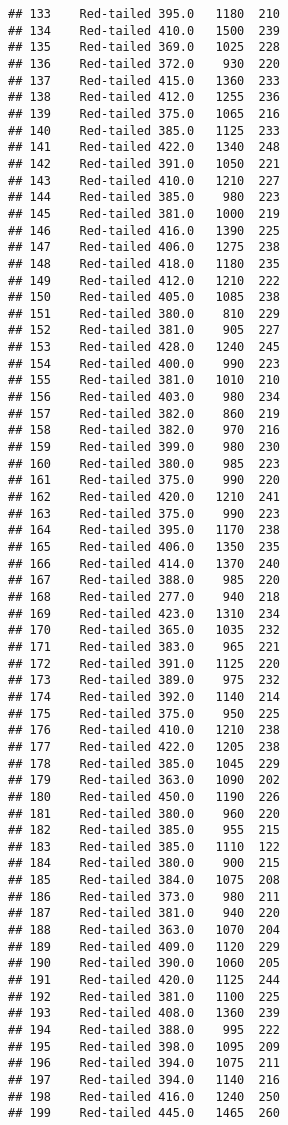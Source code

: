 \documentclass[
]{article}
\begin{document}
\begin{verbatim}
## 133    Red-tailed 395.0   1180  210
## 134    Red-tailed 410.0   1500  239
## 135    Red-tailed 369.0   1025  228
## 136    Red-tailed 372.0    930  220
## 137    Red-tailed 415.0   1360  233
## 138    Red-tailed 412.0   1255  236
## 139    Red-tailed 375.0   1065  216
## 140    Red-tailed 385.0   1125  233
## 141    Red-tailed 422.0   1340  248
## 142    Red-tailed 391.0   1050  221
## 143    Red-tailed 410.0   1210  227
## 144    Red-tailed 385.0    980  223
## 145    Red-tailed 381.0   1000  219
## 146    Red-tailed 416.0   1390  225
## 147    Red-tailed 406.0   1275  238
## 148    Red-tailed 418.0   1180  235
## 149    Red-tailed 412.0   1210  222
## 150    Red-tailed 405.0   1085  238
## 151    Red-tailed 380.0    810  229
## 152    Red-tailed 381.0    905  227
## 153    Red-tailed 428.0   1240  245
## 154    Red-tailed 400.0    990  223
## 155    Red-tailed 381.0   1010  210
## 156    Red-tailed 403.0    980  234
## 157    Red-tailed 382.0    860  219
## 158    Red-tailed 382.0    970  216
## 159    Red-tailed 399.0    980  230
## 160    Red-tailed 380.0    985  223
## 161    Red-tailed 375.0    990  220
## 162    Red-tailed 420.0   1210  241
## 163    Red-tailed 375.0    990  223
## 164    Red-tailed 395.0   1170  238
## 165    Red-tailed 406.0   1350  235
## 166    Red-tailed 414.0   1370  240
## 167    Red-tailed 388.0    985  220
## 168    Red-tailed 277.0    940  218
## 169    Red-tailed 423.0   1310  234
## 170    Red-tailed 365.0   1035  232
## 171    Red-tailed 383.0    965  221
## 172    Red-tailed 391.0   1125  220
## 173    Red-tailed 389.0    975  232
## 174    Red-tailed 392.0   1140  214
## 175    Red-tailed 375.0    950  225
## 176    Red-tailed 410.0   1210  238
## 177    Red-tailed 422.0   1205  238
## 178    Red-tailed 385.0   1045  229
## 179    Red-tailed 363.0   1090  202
## 180    Red-tailed 450.0   1190  226
## 181    Red-tailed 380.0    960  220
## 182    Red-tailed 385.0    955  215
## 183    Red-tailed 385.0   1110  122
## 184    Red-tailed 380.0    900  215
## 185    Red-tailed 384.0   1075  208
## 186    Red-tailed 373.0    980  211
## 187    Red-tailed 381.0    940  220
## 188    Red-tailed 363.0   1070  204
## 189    Red-tailed 409.0   1120  229
## 190    Red-tailed 390.0   1060  205
## 191    Red-tailed 420.0   1125  244
## 192    Red-tailed 381.0   1100  225
## 193    Red-tailed 408.0   1360  239
## 194    Red-tailed 388.0    995  222
## 195    Red-tailed 398.0   1095  209
## 196    Red-tailed 394.0   1075  211
## 197    Red-tailed 394.0   1140  216
## 198    Red-tailed 416.0   1240  250
## 199    Red-tailed 445.0   1465  260

\end{verbatim}
\end{document}
